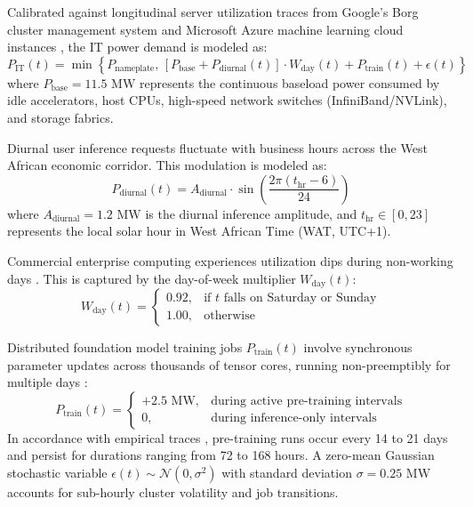 \documentclass[11pt,a4paper]{article}
\begin{document}
Calibrated against longitudinal server utilization traces from Google's Borg cluster management system \cite{Reiss2012} and Microsoft Azure machine learning cloud instances \cite{Cortez2017}, the IT power demand is modeled as:
\begin{equation}
    P_{\text{IT}}(t) = \min \left\{ P_{\text{nameplate}}, \, \left[ P_{\text{base}} + P_{\text{diurnal}}(t) \right] \cdot W_{\text{day}}(t) + P_{\text{train}}(t) + \epsilon(t) \right\}
    \label{eq:pit}
\end{equation}
where $P_{\text{base}} = 11.5\text{ MW}$ represents the continuous baseload power consumed by idle accelerators, host CPUs, high-speed network switches (InfiniBand/NVLink), and storage fabrics.

Diurnal user inference requests fluctuate with business hours across the West African economic corridor. This modulation is modeled as:
\begin{equation}
    P_{\text{diurnal}}(t) = A_{\text{diurnal}} \cdot \sin\left(\frac{2\pi (t_{\text{hr}} - 6)}{24}\right)
    \label{eq:pdiurnal}
\end{equation}
where $A_{\text{diurnal}} = 1.2\text{ MW}$ is the diurnal inference amplitude, and $t_{\text{hr}} \in [0, 23]$ represents the local solar hour in West African Time (WAT, UTC+1). 

Commercial enterprise computing experiences utilization dips during non-working days \cite{Cortez2017}. This is captured by the day-of-week multiplier $W_{\text{day}}(t)$:
\begin{equation}
    W_{\text{day}}(t) = \begin{cases} 
        0.92, & \text{if } t \text{ falls on Saturday or Sunday} \\
        1.00, & \text{otherwise}
    \end{cases}
    \label{eq:wday}
\end{equation}

Distributed foundation model training jobs $P_{\text{train}}(t)$ involve synchronous parameter updates across thousands of tensor cores, running non-preemptibly for multiple days \cite{Weng2022, Narayanan2021}:
\begin{equation}
    P_{\text{train}}(t) = \begin{cases} 
        +2.5\text{ MW}, & \text{during active pre-training intervals} \\
        0, & \text{during inference-only intervals}
    \end{cases}
    \label{eq:ptrain}
\end{equation}
In accordance with empirical traces \cite{Weng2022}, pre-training runs occur every 14 to 21 days and persist for durations ranging from 72 to 168 hours. A zero-mean Gaussian stochastic variable $\epsilon(t) \sim \mathcal{N}(0, \sigma^2)$ with standard deviation $\sigma = 0.25\text{ MW}$ accounts for sub-hourly cluster volatility and job transitions.
\end{document}
